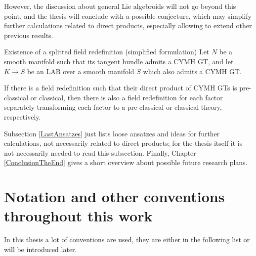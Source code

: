 However, the discussion about general Lie algebroids will not go beyond this point, and the thesis will conclude with a possible conjecture, which may simplify further calculations related to direct products, especially allowing to extend other previous results.

\begin{conjectures*}{Existence of a splitted field redefinition (simplified formulation)}
Let $N$ be a smooth manifold such that its tangent bundle admits a CYMH GT, and let $K \to S$ be an LAB over a smooth manifold $S$ which also admits a CYMH GT.

If there is a field redefinition such that their direct product of CYMH GTs is pre-classical or classical, then there is also a field redefinition for each factor separately transforming each factor to a pre-classical or classical theory, respectively.
\end{conjectures*}

Subsection \ref{LastAnsatzes} just lists loose ansatzes and ideas for further calculations, not necessarily related to direct products; for the thesis itself it is not necessarily needed to read this subsection. Finally, Chapter \ref{ConclusionTheEnd} gives a short overview about possible future research plans.

\section{Notation and other conventions throughout this work}\label{StandardNotation}

In this thesis a lot of conventions are used, they are either in the following list or will be introduced later.


